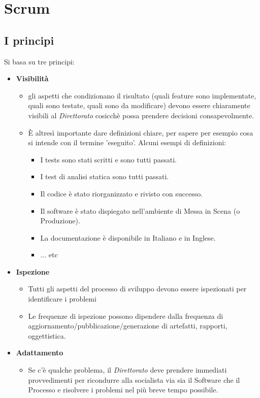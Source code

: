\chapter{Scrum}

\section{I principi}

Si basa su tre principi:
\begin{itemize}
  \item \textbf{Visibilit\`a}
  \begin{itemize}
    \item gli aspetti che condizionano il risultato (quali feature sono implementate, quali sono testate, quali sono da modificare) devono essere chiaramente visibili al \textit{Direttorato} cosicch\`e possa prendere decisioni consapevolmente.
    \item \`E altres\`i importante dare definizioni chiare, per sapere per esempio cosa si intende con il termine 'eseguito'. Alcuni esempi di definizioni:
    \begin{itemize}
      \item I tests sono stati scritti e sono tutti passati.
      \item I test di analisi statica sono tutti passati.
      \item Il codice \`e stato riorganizzato e rivisto con successo.
      \item Il software \`e stato dispiegato nell'ambiente di Messa in Scena (o Produzione).
      \item La documentazione \`e disponibile in Italiano e in Inglese.
      \item ... etc
    \end{itemize}
  \end{itemize}
  \item \textbf{Ispezione}
  \begin{itemize}
    \item Tutti gli aspetti del processo di sviluppo devono essere ispezionati per identificare i problemi
    \item Le frequenze di ispezione possono dipendere dalla frequenza di aggiornamento/pubblicazione/generazione di artefatti, rapporti, oggettistica.
  \end{itemize}
  \item \textbf{Adattamento}
  \begin{itemize}
    \item Se c'\`e qualche problema, il \textit{Direttorato} deve prendere immediati provvedimenti per ricondurre alla socialista via sia il Software che il Processo e risolvere i problemi nel pi\`u breve tempo possibile.
  \end{itemize}
\end{itemize}

